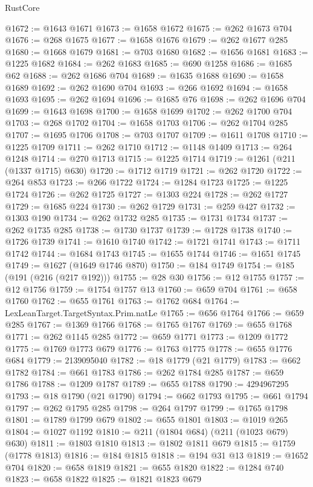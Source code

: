 \begin{lexlean}{RustCore}
\begin{coremodule}
@1672 := @1643 @1671
@1673 := @1658 @1672
@1675 := @262 @1673 @704
@1676 := @268 @1675
@1677 := @1658 @1676
@1679 := @262 @1677 @285
@1680 := @1668 @1679
@1681 := @703 @1680
@1682 := @1656 @1681
@1683 := @1225 @1682
@1684 := @262 @1683
@1685 := @690 @1258
@1686 := @1685 @62
@1688 := @262 @1686 @704
@1689 := @1635 @1688
@1690 := @1658 @1689
@1692 := @262 @1690 @704
@1693 := @266 @1692
@1694 := @1658 @1693
@1695 := @262 @1694
@1696 := @1685 @76
@1698 := @262 @1696 @704
@1699 := @1643 @1698
@1700 := @1658 @1699
@1702 := @262 @1700 @704
@1703 := @268 @1702
@1704 := @1658 @1703
@1706 := @262 @1704 @285
@1707 := @1695 @1706
@1708 := @703 @1707
@1709 := @1611 @1708
@1710 := @1225 @1709
@1711 := @262 @1710
@1712 := @1148 @1409
@1713 := @264 @1248
@1714 := @270 @1713
@1715 := @1225 @1714
@1719 := @1261 (@211 (@1337 @1715) @630)
@1720 := @1712 @1719
@1721 := @262 @1720
@1722 := @264 @853
@1723 := @266 @1722
@1724 := @1284 @1723
@1725 := @1225 @1724
@1726 := @262 @1725
@1727 := @1303 @224
@1728 := @262 @1727
@1729 := @1685 @224
@1730 := @262 @1729
@1731 := @259 @427
@1732 := @1303 @190
@1734 := @262 @1732 @285
@1735 := @1731 @1734
@1737 := @262 @1735 @285
@1738 := @1730 @1737
@1739 := @1728 @1738
@1740 := @1726 @1739
@1741 := @1610 @1740
@1742 := @1721 @1741
@1743 := @1711 @1742
@1744 := @1684 @1743
@1745 := @1655 @1744
@1746 := @1651 @1745
@1749 := @1627 (@1649 @1746 @870)
@1750 := @184 @1749
@1754 := @185 (@191 (@216 (@217 @192)))
@1755 := @28 @30
@1756 := @12 @1755
@1757 := @12 @1756
@1759 := @1754 @1757 @13
@1760 := @659 @704
@1761 := @658 @1760
@1762 := @655 @1761
@1763 := @1762 @684
@1764 := LexLeanTarget.TargetSyntax.Prim.natLe
@1765 := @656 @1764
@1766 := @659 @285
@1767 := @1369 @1766
@1768 := @1765 @1767
@1769 := @655 @1768
@1771 := @262 @1145 @285
@1772 := @659 @1771
@1773 := @1209 @1772
@1775 := @1769 @1773 @679
@1776 := @1763 @1775
@1778 := @655 @1776 @684
@1779 := 2139095040
@1782 := @18 @1779 (@21 @1779)
@1783 := @662 @1782
@1784 := @661 @1783
@1786 := @262 @1784 @285
@1787 := @659 @1786
@1788 := @1209 @1787
@1789 := @655 @1788
@1790 := 4294967295
@1793 := @18 @1790 (@21 @1790)
@1794 := @662 @1793
@1795 := @661 @1794
@1797 := @262 @1795 @285
@1798 := @264 @1797
@1799 := @1765 @1798
@1801 := @1789 @1799 @679
@1802 := @655 @1801
@1803 := @1019 @265
@1804 := @1027 @1192
@1810 := @211 (@1804 @684) (@211 (@1023 @679) @630)
@1811 := @1803 @1810
@1813 := @1802 @1811 @679
@1815 := @1759 (@1778 @1813)
@1816 := @184 @1815
@1818 := @194 @31 @13
@1819 := @1652 @704
@1820 := @658 @1819
@1821 := @655 @1820
@1822 := @1284 @740
@1823 := @658 @1822
@1825 := @1821 @1823 @679

\end{coremodule}
\end{lexlean}
